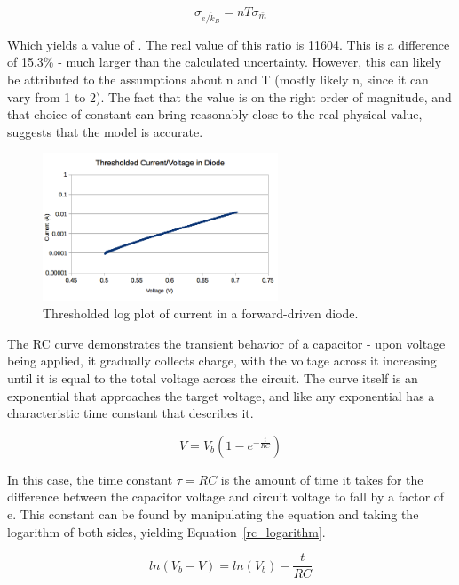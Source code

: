 \documentclass[journal]{IEEEtran}
\begin{document}
\begin{displaymath}
\sigma _{\overline{e/k_B}} = n T \sigma _{\bar m}
\end{displaymath}

Which yields a value of . The real value of this ratio is
11604. This is a difference of 15.3\% - much larger than the calculated
uncertainty. However, this can likely be attributed to the assumptions about n
and T (mostly likely n, since it can vary from 1 to 2). The fact that the value
is on the right order of magnitude, and that choice of constant can bring
reasonably close to the real physical value, suggests that the model is
accurate.

\begin{figure}[ht!]
\centering
\includegraphics[width=70mm]{dio_thresh.png}
\caption{Thresholded log plot of current in a forward-driven diode.}
\label{fig:dio_thresh}
\end{figure}

The RC curve demonstrates the transient behavior of a capacitor - upon voltage
being applied, it gradually collects charge, with the voltage across it
increasing until it is equal to the total voltage across the circuit. The curve
itself is an exponential that approaches the target voltage, and like any
exponential has a characteristic time constant that describes it.

\begin{displaymath}
V = V_b \left(1 - e^{-\frac{t}{RC}}\right)
\end{displaymath} 

In this case, the time constant $\tau = RC$ is the amount of time it takes for
the difference between the capacitor voltage and circuit voltage to fall by a
factor of e. This constant can be found by manipulating the equation and taking
the logarithm of both sides, yielding Equation~\ref{rc_logarithm}.

\begin{equation}
\label{rc_logarithm}
ln(V_b - V) = ln(V_b) - \frac{t}{RC}
\end{equation}
\end{document}
